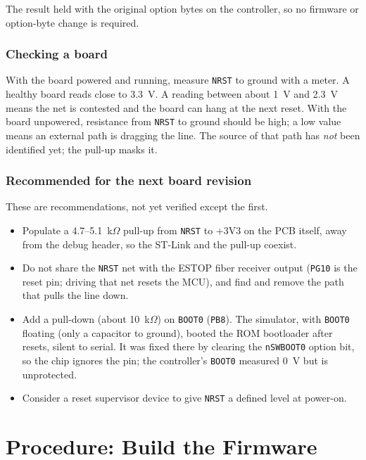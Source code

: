 \documentclass[11pt]{article}
\newcommand{\code}[1]{\texttt{#1}}
\begin{document}
\noindent The result held with the original option bytes on the
controller, so no firmware or option-byte change is required.

\subsubsection*{Checking a board}

With the board powered and running, measure \code{NRST} to ground with a
meter. A healthy board reads close to 3.3~V. A reading between about 1~V
and 2.3~V means the net is contested and the board can hang at the next
reset. With the board unpowered, resistance from \code{NRST} to ground
should be high; a low value means an external path is dragging the line.
The source of that path has \emph{not} been identified yet; the pull-up
masks it.

\subsubsection*{Recommended for the next board revision}

These are recommendations, not yet verified except the first.

\begin{itemize}
  \item Populate a 4.7--5.1~k$\Omega$ pull-up from \code{NRST} to +3V3 on
    the PCB itself, away from the debug header, so the ST-Link and the
    pull-up coexist.
  \item Do not share the \code{NRST} net with the ESTOP fiber receiver
    output (\code{PG10} is the reset pin; driving that net resets the
    MCU), and find and remove the path that pulls the line down.
  \item Add a pull-down (about 10~k$\Omega$) on \code{BOOT0} (\code{PB8}).
    The simulator, with \code{BOOT0} floating (only a capacitor to
    ground), booted the ROM bootloader after resets, silent to serial.
    It was fixed there by clearing the \code{nSWBOOT0} option bit, so
    the chip ignores the pin; the controller's \code{BOOT0} measured
    0~V but is unprotected.
  \item Consider a reset supervisor device to give \code{NRST} a defined
    level at power-on.
\end{itemize}

\section{Procedure: Build the Firmware}
\label{sec:build}
\end{document}
